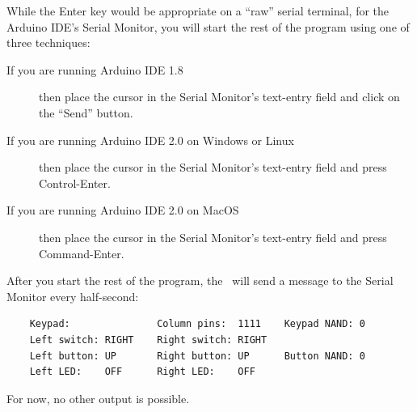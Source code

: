 While the Enter key would be appropriate on a ``raw'' serial terminal, for the Arduino IDE's Serial Monitor, you will start the rest of the program using one of three techniques:
\begin{description}
    \item[If you are running Arduino IDE 1.8] then place the cursor in the Serial Monitor's text-entry field and click on the ``Send'' button.
    \item[If you are running Arduino IDE 2.0 on Windows or Linux] then place the cursor in the Serial Monitor's text-entry field and press Control-Enter.
    \item[If you are running Arduino IDE 2.0 on MacOS] then place the cursor in the Serial Monitor's text-entry field and press Command-Enter.
\end{description}

After you start the rest of the program, the \developmentboard\ will send a message to the Serial Monitor every half-second:

\begin{verbatim}
    Keypad:               Column pins:  1111    Keypad NAND: 0
    Left switch: RIGHT    Right switch: RIGHT
    Left button: UP       Right button: UP      Button NAND: 0
    Left LED:    OFF      Right LED:    OFF
\end{verbatim}

For now, no other output is possible.
